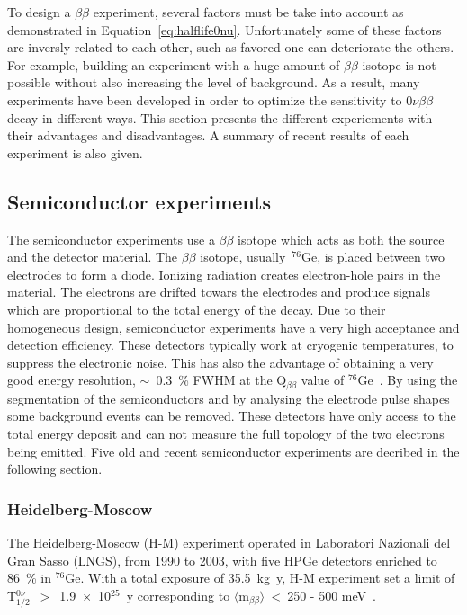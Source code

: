 \documentclass[main.tex]{subfiles}
\begin{document}
\NI To design a $\beta\beta$ experiment, several factors must be take into account as demonstrated in Equation~\ref{eq:halflife0nu}. Unfortunately some of these factors are inversly related to each other, such as favored one can deteriorate the others. For example, building an experiment with a huge amount of $\beta\beta$ isotope is not possible without also increasing the level of background. As a result, many experiments have been developed in order to optimize the sensitivity to 0$\nu\beta\beta$ decay in different ways. This section presents the different experiements with their advantages and disadvantages. A summary of recent results of each experiment is also given.


\subsection{Semiconductor experiments}


\NI The semiconductor experiments use a $\beta\beta$ isotope which acts as both the source and the detector material. The $\beta\beta$ isotope, usually~$^{\text{76}}$Ge, is placed between two electrodes to form a diode. Ionizing radiation creates electron-hole pairs in the material. The electrons are drifted towars the electrodes and produce signals which are proportional to the total energy of the decay. Due to their homogeneous design, semiconductor experiments have a very high acceptance and detection efficiency. These detectors typically work at cryogenic temperatures, to suppress the electronic noise. This has also the advantage of obtaining a very good energy resolution, $\sim$~0.3~\% FWHM at the Q$_{\beta\beta}$ value of $^{\text{76}}$Ge~\cite{QbetabetaGe}. By using the segmentation of the semiconductors and by analysing the electrode pulse shapes some background events can be removed. These detectors have only access to the total energy deposit and can not measure the full topology of the two electrons being emitted. Five old and recent semiconductor experiments are decribed in the following section.


\subsubsection{Heidelberg-Moscow}


\NI The Heidelberg-Moscow (H-M) experiment operated in Laboratori Nazionali del Gran Sasso (LNGS), from 1990 to 2003, with five HPGe detectors enriched to 86~\% in $^{\text{76}}$Ge. With a total exposure of 35.5~kg~y, H-M experiment set a limit of T$_{\text{1/2}}^{0\nu}$~$>$~1.9~$\times$~10$^{\text{25}}$~y corresponding to $\langle \text{m}_{\beta\beta} \rangle$~<~250 - 500 meV~\cite{HeidelbergMoscow1}.
\end{document}
